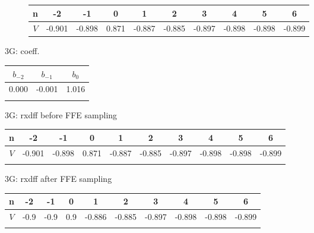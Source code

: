 \documentclass{book}  %
\begin{document}
\begin{paper}
\begin{figure}
	\begin{minipage}[tb]{\textwidth}
		\centering	
		\begin{tabular}{|c|c|c|c|c|c|c|c|c|c|}\hline
			n  &   -2   &   -1   &   0   &    1   &    2   &    3   &    4   &    5   &    6   \\ \hline 
			$V$ & -0.901 & -0.898 & 0.871 & -0.887 & -0.885 & -0.897 & -0.898 & -0.898 & -0.899 \\ \hline
		\end{tabular} 
		\label{table:3G_rxdiff_sample_wo_FFE}
	\end{minipage}	
\end{figure}




3G: coeff.
\begin{tabular}{|c|c|c|}\hline
	$b_{-2}$ & $b_{-1}$ &  $b_{0}$ \\ \hline 
	0.000 &   -0.001 &    1.016 \\ \hline 
	\label{table:3G_FFE_coeff}
\end{tabular}

3G: rxdff before FFE sampling
\begin{tabular}{|c|c|c|c|c|c|c|c|c|c|}\hline
	n  &   -2   &   -1   &   0   &    1   &    2   &    3   &    4   &    5   &    6   \\ \hline 
	$V$ & -0.901 & -0.898 & 0.871 & -0.887 & -0.885 & -0.897 & -0.898 & -0.898 & -0.899 \\ \hline 
	\label{table:3G_rxdiff_sample_wo_FFE}
\end{tabular}

3G: rxdff after FFE sampling
\begin{tabular}{|c|c|c|c|c|c|c|c|c|c|}\hline
	n  &  -2  &  -1  &  0  &    1   &    2   &    3   &    4   &    5   &    6   \\ \hline 
	$V$ & -0.9 & -0.9 & 0.9 & -0.886 & -0.885 & -0.897 & -0.898 & -0.898 & -0.899 \\ \hline
	\label{table:3G_rxdiff_sample_w__FFE} 
	
\end{tabular}



\end{paper}
\end{document}

